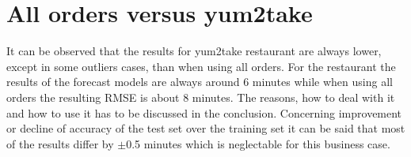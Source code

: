 \begin{table}[h]
\centering
\caption{Combination of Categorizations results for yum2take}
\label{Combination of Categorizations results for yum2take}
\end{table}

\section{All orders versus yum2take}\label{section:All orders versus yum2take}
It can be observed that the results for yum2take restaurant are always lower, except in some outliers cases, than when using all orders. For the restaurant the results of the forecast models are always around 6 minutes while when using all orders the resulting RMSE is about 8 minutes. The reasons, how to deal with it and how to use it has to be discussed in the conclusion.\newline
Concerning improvement or decline of accuracy of the test set over the training set it can be said that most of the results differ by $\pm$0.5 minutes which is neglectable for this business case.
